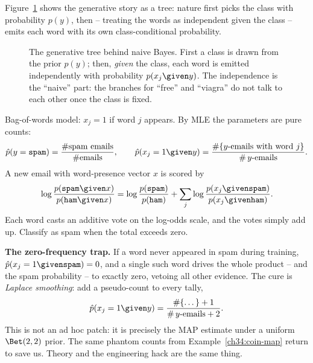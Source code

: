 Figure~\ref{ch34:fig-nbtree} shows the generative story as a tree: nature first
picks the class with probability $p(y)$, then -- treating the words as
independent given the class -- emits each word with its own class-conditional
probability.

\begin{figure}[H]
\centering
{}
\caption{The generative tree behind naive Bayes. First a class is drawn from the
prior $p(y)$; then, \emph{given} the class, each word is emitted independently
with probability $p(x_j\given y)$. The independence is the ``naive'' part: the
branches for ``free'' and ``viagra'' do not talk to each other once the class is
fixed.}
\label{ch34:fig-nbtree}
\end{figure}

\begin{example}
\label{ch34:spam}
Bag-of-words model: $x_j = 1$ if word $j$ appears. By MLE the parameters are pure
counts:
\[
  \hat p(y=\texttt{spam}) = \frac{\#\text{spam emails}}{\#\text{emails}},
  \qquad
  \hat p(x_j=1\given y) = \frac{\#\{y\text{-emails with word } j\}}{\#\,y\text{-emails}}.
\]
A new email with word-presence vector $x$ is scored by
\[
  \log\frac{p(\texttt{spam}\given x)}{p(\texttt{ham}\given x)}
  = \log\frac{p(\texttt{spam})}{p(\texttt{ham})}
   + \sum_{j} \log\frac{p(x_j\given\texttt{spam})}{p(x_j\given\texttt{ham})}.
\]
Each word casts an additive vote on the log-odds scale, and the votes simply add
up. Classify as spam when the total exceeds zero.
\end{example}

\begin{trapbox}
\textbf{The zero-frequency trap.} If a word never appeared in spam during
training, $\hat p(x_j=1\given\texttt{spam}) = 0$, and a single such word drives
the whole product -- and the spam probability -- to exactly zero, vetoing all
other evidence. The cure is \emph{Laplace smoothing}: add a pseudo-count to every
tally,
\[
  \hat p(x_j=1\given y) = \frac{\#\{\dots\} + 1}{\#\,y\text{-emails} + 2}.
\]
This is not an ad hoc patch: it is precisely the MAP estimate under a uniform
$\Bet(2,2)$ prior. The same phantom counts from Example~\ref{ch34:coin-map}
return to save us. Theory and the engineering hack are the same thing.
\end{trapbox}


